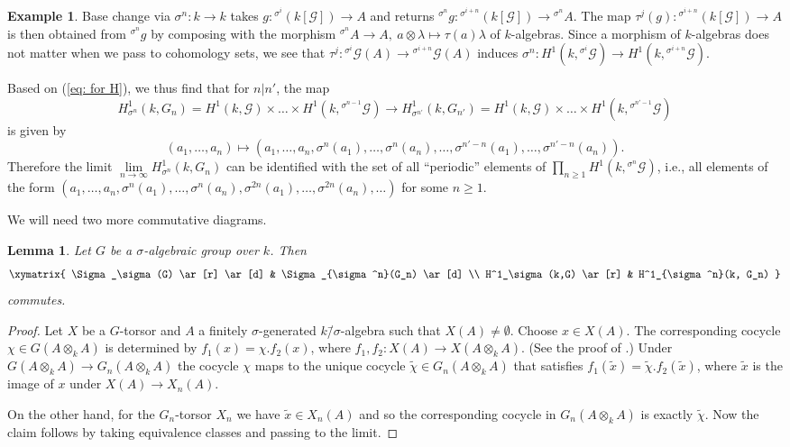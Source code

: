 \documentclass[oneside,reqno]{amsart}
\newtheorem{lemma}[theo]{Lemma}
\theoremstyle{definition}
\newtheorem{ex}[theo]{Example}
\newcommand{\G}{\mathcal{G}}
\newcommand{\s}{\sigma}
\newcommand{\ks}{$k$\=/$\s$}
\newcommand{\hsi}{^{\sigma^i}\!}
\newcommand{\hsn}{^{\sigma^n}\!}
\begin{document}
\begin{ex}
	Base change via $\s^n\colon k\to k$ takes $g\colon {\hsi(k[\G])}\to A$ and returns $\hsn g\colon{^{\s^{i+n}}\!{(k[\G])}}\to{\hsn A}$.
	The map $\tau^j(g)\colon {^{\s^{i+n}}\!{(k[\G])}}\to A$ is then obtained from $\hsn g$ by composing with the morphism ${\hsn A}\to A,\ a\otimes\lambda\mapsto \tau(a)\lambda$ of $k$-algebras. Since a morphism of $k$-algebras does not matter when we pass to cohomology sets, we see that $\tau^j\colon {\hsi}\G(A)\to {^{\s^{i+n}}\!\G}(A)$ induces $\s^n\colon H^1(k,{\hsi\G})\to H^1(k,{^{\s^{i+n}}\!\G})$.
	
	Based on (\ref{eq: for H}), we thus find that for $n|n'$, the map	
	$$H^1_{\s^n}(k,G_n)=H^1(k,\G)\times\ldots\times H^1(k,{^{\s^{n-1}}\!\G})\longrightarrow H^1_{\s^{n'}}(k,G_{n'})=H^1(k,\G)\times\ldots\times H^1(k,{^{\s^{n'-1}}\!\G})$$
	is given by $$(a_1,\ldots,a_n)\longmapsto (a_1,\ldots,a_n,\s^n(a_1),\ldots,\s^n(a_n),\ldots,\s^{n'-n}(a_1),\ldots,\s^{n'-n}(a_n)).$$
	Therefore the limit $\lim\limits_{n\to \infty} H^1_{\s^n}(k,G_n)$ can be identified with the set of all ``periodic'' elements of $\prod_{n\geq 1}H^1(k,{\hsn\G})$, i.e., all elements of the form
	$(a_1,\ldots,a_n,\s^n(a_1),\ldots,\s^n(a_n),\s^{2n}(a_1),\ldots,\s^{2n}(a_n),\ldots)$ for some $n\geq 1$.
	 
	
\end{ex}	



 We will need two more commutative diagrams. 


\begin{lemma} \label{lemma: commutes on H1}
	Let $G$ be a $\s$-algebraic group over $k$. Then
	$$
	\xymatrix{
	\Sigma_\s(G) \ar[r] \ar[d] & \Sigma_{\s^n}(G_n) \ar[d] \\
	H^1_\s(k,G) \ar[r] & H^1_{\s^n}(k, G_n)	
	}
	$$
	commutes.	
\end{lemma}
\begin{proof}
	Let $X$ be a $G$-torsor and $A$ a finitely $\s$-generated \ks-algebra such that $X(A)\neq\emptyset$. Choose $x\in X(A)$. The corresponding cocycle $\chi\in G(A\otimes_k A)$ is determined by $f_1(x)=\chi.f_2(x)$, where $f_1,f_2\colon X(A)\to X(A\otimes_k A)$. (See the proof of \cite[Theorem 4.1]{BachmayrWibmer:TorsorsForDifferenceAlgebraicGroups}.)
	Under $G(A\otimes_k A)\to G_n(A\otimes_k A)$ the cocycle $\chi$ maps to the unique cocycle $\widetilde{\chi}\in G_n(A\otimes_k A)$ that satisfies $f_1(\widetilde{x})=\widetilde{\chi}.f_2(\widetilde{x})$, where $\widetilde{x}$ is the image of $x$ under $X(A)\to X_n(A)$.
	
	On the other hand, for the $G_n$-torsor $X_n$ we have $\widetilde{x}\in X_n(A)$ and so the corresponding cocycle in $G_n(A\otimes_k A)$ is exactly $\widetilde{\chi}$. Now the claim follows by taking equivalence classes and passing to the limit.
\end{proof}
\end{document}

